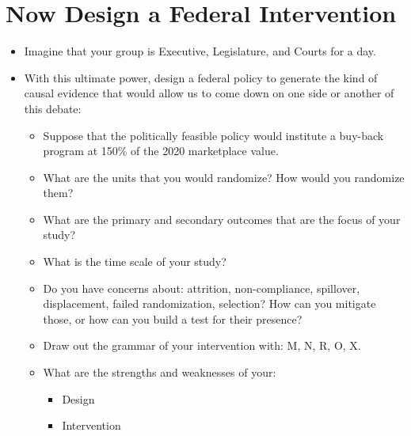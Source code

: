 \documentclass{article}
\begin{document}
\section{Now Design a Federal Intervention}
\label{sec:orgd00c894}
\begin{itemize}
\item Imagine that your group is Executive, Legislature, and Courts for a day.
\item With this ultimate power, design a federal policy to generate the kind of causal evidence that would allow us to come down on one side or another of this debate:
\begin{itemize}
\item Suppose that the politically feasible policy would institute a buy-back program at 150\% of the 2020 marketplace value.
\item What are the units that you would randomize? How would you randomize them?
\item What are the primary and secondary outcomes that are the focus of your study?
\item What is the time scale of your study?
\item Do you have concerns about: attrition, non-compliance, spillover, displacement, failed randomization, selection? How can you mitigate those, or how can you build a test for their presence?
\item Draw out the grammar of your intervention with: M, N, R, O, X.
\item What are the strengths and weaknesses of your:
\begin{itemize}
\item Design
\item Intervention
\end{itemize}
\end{itemize}
\end{itemize}
\end{document}

